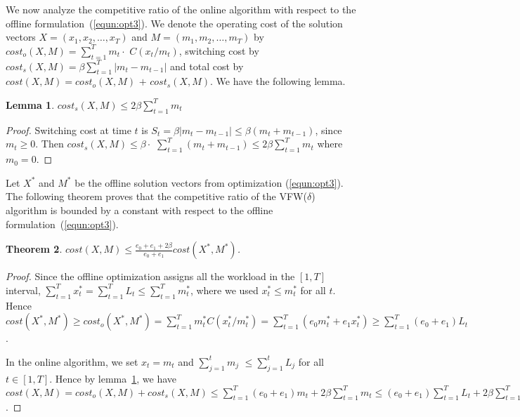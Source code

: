 \documentclass[10pt,conference,compsocconf,letterpaper]{IEEEtran}
\newtheorem{lemma}{\bf Lemma}
\newtheorem{theorem}[lemma]{\bf Theorem}
\begin{document}
We now analyze the competitive ratio of the online algorithm with respect to the offline formulation~(\ref{equn:opt3}). We denote the operating cost of the solution vectors $X = (x_1,x_2,\ldots,x_T)$ and $M = (m_1,m_2,\ldots,m_T)$ by $cost_o(X,M)=\sum_{t=1}^T m_t \cdot$ $C(x_t/m_t)$, switching cost by $cost_s(X,M) = \beta \sum_{t=1}^T |m_t-m_{t-1}|$ and total cost by $cost(X,M) = cost_o(X,M)$ $+$ $cost_s(X,M)$. We have the following lemma.


\begin{lemma}
\label{lemma:online24}
$cost_s(X,M) \le 2\beta\sum_{t=1}^{T} m_t$
\end{lemma}

\begin{proof}
Switching cost at time $t$ is $S_t = \beta|m_t-m_{t-1}|\le \beta(m_t + m_{t-1})$, since $m_t\ge 0$. Then $cost_s(X,M)\le \beta \cdot$ $\sum_{t=1}^T (m_t + m_{t-1}) \le  2\beta \sum_{t=1}^T m_t$ where $m_0 = 0$.
\end{proof}

Let $X^*$ and $M^*$ be the offline solution vectors from optimization (\ref{equn:opt3}). The following theorem proves that the competitive ratio of the VFW($\delta$) algorithm is bounded by a constant with respect to the offline formulation~(\ref{equn:opt3}).



\begin{theorem}
\label{theorem:online1}
$cost(X,M) \le \frac{e_0+e_1+2\beta}{e_0 + e_1}cost(X^*,M^*)$.
\end{theorem}

\begin{proof}
Since the offline optimization assigns all the workload in the $[1,T]$ interval, $\sum_{t=1}^T x^*_t = \sum_{t=1}^T L_t \le \sum_{t=1}^T m^*_t$, where we used $x^*_t\le m^*_t$ for all $t$. Hence $cost(X^*,M^*) \ge cost_o(X^*,M^*) = \sum_{t=1}^T m^*_tC(x^*_t/m^*_t) = \sum_{t=1}^T (e_0 m^*_t + e_1 x^*_t) \ge  \sum_{t=1}^T (e_0 + e_1) L_t$.

In the online algorithm, we set $x_t = m_t$ and $\sum_{j=1}^t m_j$ $\le \sum_{j=1}^t L_j$ for all $t\in[1,T]$. Hence by lemma~\ref{lemma:online24}, we have $cost(X,M) = cost_o(X,M)+ cost_s(X,M) \le \sum_{t=1}^T (e_0 + e_1) m_t + 2\beta\sum_{t=1}^{T} m_t  \le (e_0+ e_1) \sum_{t=1}^T  L_t + 2\beta\sum_{t=1}^T L_t = (e_0 + e_1 +2\beta)\sum_{t=1}^T L_t$.
\end{proof}
\end{document}
